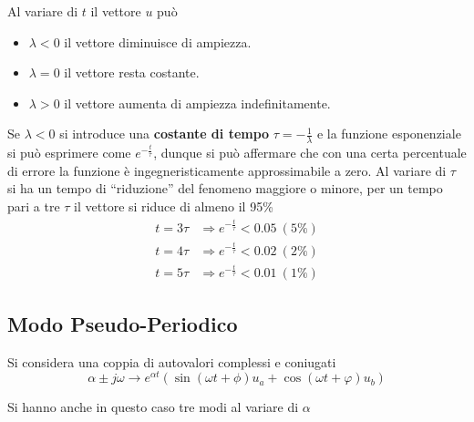 Al variare di $t$ il vettore $u$ può
\begin{itemize}
\item $\lambda<0$ il vettore diminuisce di ampiezza.
\item $\lambda=0$ il vettore resta costante.
\item $\lambda>0$ il
vettore aumenta di ampiezza indefinitamente.
\end{itemize}

Se $\lambda<0$ si introduce una \textbf{costante di tempo} $\tau =
-\frac{1}{\lambda}$
e la funzione esponenziale si può esprimere come
$e^{-\frac{t}{\tau}}$, dunque si può affermare che con una certa percentuale di
errore la funzione è ingegneristicamente approssimabile a zero.
Al variare di $\tau$ si ha un tempo di ``riduzione'' del fenomeno maggiore o
minore, per un tempo pari a tre $\tau$ il vettore si riduce di almeno il 95\%
$$\begin{aligned}
t=3\tau&\Rightarrow e^{-\frac{t}{\tau}}
< 0.05\ (5\%)\\
t=4\tau&\Rightarrow e^{-\frac{t}{\tau}}
< 0.02\ (2\%)\\
t=5\tau&\Rightarrow e^{-\frac{t}{\tau}}
< 0.01\ (1\%)
\end{aligned}$$

\newpage
\subsection{Modo Pseudo-Periodico}
Si considera una coppia di autovalori complessi e coniugati
$$
\alpha \pm j\omega \rightarrow e^{\alpha t}\left(\sin(\omega t + \phi)u_a +
\cos(\omega t + \varphi)u_b\right)
$$

Si hanno anche in questo caso tre modi al variare di $\alpha$


